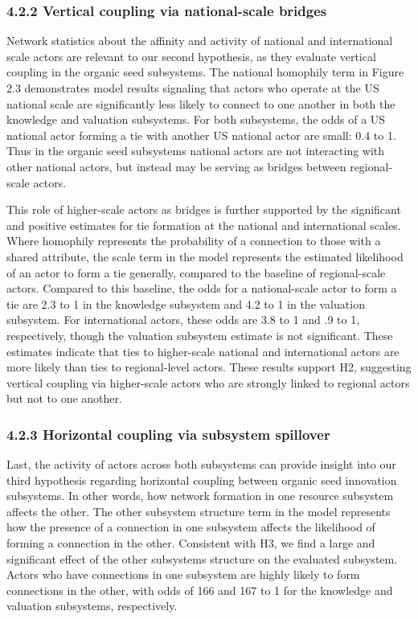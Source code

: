 \documentclass[twoside,12pt,final]{ucthesis-CA2012}
\begin{document}
\begin{ucmainmatter}
{\subsubsection{4.2.2 Vertical coupling via national-scale bridges}\label{vertical-coupling-via-national-scale-bridges}}

Network statistics about the affinity and activity of national and
international scale actors are relevant to our second hypothesis, as
they evaluate vertical coupling in the organic seed subsystems. The
national homophily term in Figure 2.3 demonstrates model results
signaling that actors who operate at the US national scale are
significantly less likely to connect to one another in both the
knowledge and valuation subsystems. For both subsystems, the odds of a
US national actor forming a tie with another US national actor are
small: 0.4 to 1. Thus in the organic seed subsystems national actors are
not interacting with other national actors, but instead may be serving
as bridges between regional-scale actors.

This role of higher-scale actors as bridges is further supported by the
significant and positive estimates for tie formation at the national and
international scales. Where homophily represents the probability of a
connection to those with a shared attribute, the \textquotesingle scale\textquotesingle{} term in the
model represents the estimated likelihood of an actor to form a tie
generally, compared to the baseline of regional-scale actors. Compared
to this baseline, the odds for a national-scale actor to form a tie are
2.3 to 1 in the knowledge subsystem and 4.2 to 1 in the valuation
subsystem. For international actors, these odds are 3.8 to 1 and .9 to
1, respectively, though the valuation subsystem estimate is not
significant. These estimates indicate that ties to higher-scale national
and international actors are more likely than ties to regional-level
actors. These results support H2, suggesting vertical coupling via
higher-scale actors who are strongly linked to regional actors but not
to one another.

\hypertarget{horizontal-coupling-via-subsystem-spillover}{%
\subsubsection{4.2.3 Horizontal coupling via subsystem spillover}\label{horizontal-coupling-via-subsystem-spillover}}

Last, the activity of actors across both subsystems can provide insight
into our third hypothesis regarding horizontal coupling between organic
seed innovation subsystems. In other words, how network formation in one
resource subsystem affects the other. The \textquotesingle other subsystem structure\textquotesingle{}
term in the model represents how the presence of a connection in one
subsystem affects the likelihood of forming a connection in the other.
Consistent with H3, we find a large and significant effect of the other
subsystems\textquotesingle{} structure on the evaluated subsystem. Actors who have
connections in one subsystem are highly likely to form connections in
the other, with odds of 166 and 167 to 1 for the knowledge and valuation
subsystems, respectively.


\end{ucmainmatter}
\end{document}
